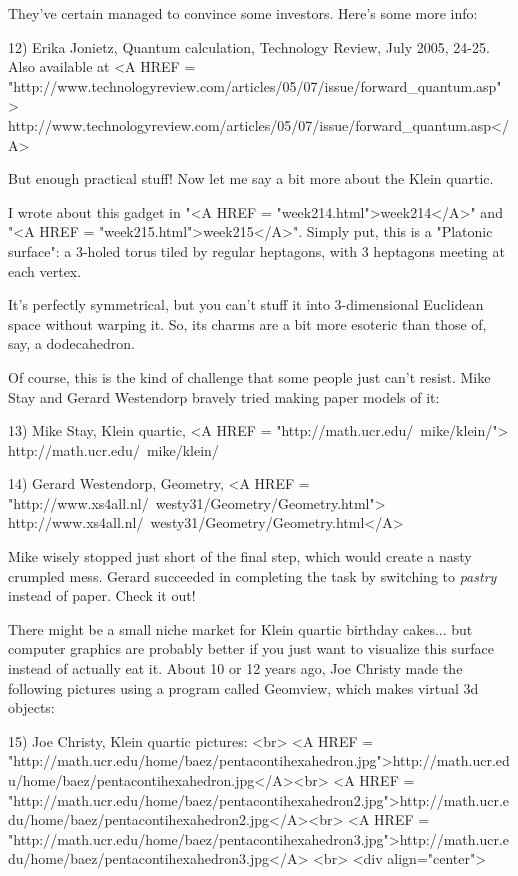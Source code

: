They've certain managed to convince some investors.  Here's some more info:

12) Erika Jonietz, Quantum calculation, Technology Review, July 2005, 24-25.
    Also available at
    <A HREF = "http://www.technologyreview.com/articles/05/07/issue/forward_quantum.asp">
http://www.technologyreview.com/articles/05/07/issue/forward_quantum.asp</A>

But enough practical stuff!  Now let me say a bit more about the Klein quartic.  

I wrote about this gadget in 
"<A HREF = "week214.html">week214</A>" and 
"<A HREF = "week215.html">week215</A>".   
Simply put, this is a "Platonic surface": 
a 3-holed torus tiled by regular heptagons, with 3 
heptagons meeting at each vertex.  

It's perfectly symmetrical, but you can't stuff it into 3-dimensional Euclidean 
space without warping it.  So, its charms are a bit more esoteric than those of,
say, a dodecahedron.

Of course, this is the kind of challenge that some people just can't resist.  
Mike Stay and Gerard Westendorp bravely tried making paper models of it:

13) Mike Stay, Klein quartic, <A HREF = 
"http://math.ucr.edu/~mike/klein/">
http://math.ucr.edu/~mike/klein/

14) Gerard Westendorp, Geometry, <A HREF = 
"http://www.xs4all.nl/~westy31/Geometry/Geometry.html">
http://www.xs4all.nl/~westy31/Geometry/Geometry.html</A>

Mike wisely stopped just short of the final step, which would create a nasty 
crumpled mess.  Gerard succeeded in completing the task by switching to \emph{pastry}
instead of paper.  Check it out!

There might be a small niche market for Klein quartic birthday cakes... but 
computer graphics are probably better if you just want to visualize this surface
instead of actually eat it.  About 10 or 12 years ago, Joe Christy made the 
following pictures using a program called Geomview, which makes virtual 3d objects:

15) Joe Christy, Klein quartic pictures: <br>
    <A HREF = "http://math.ucr.edu/home/baez/pentacontihexahedron.jpg">http://math.ucr.edu/home/baez/pentacontihexahedron.jpg</A><br>
    <A HREF = "http://math.ucr.edu/home/baez/pentacontihexahedron2.jpg">http://math.ucr.edu/home/baez/pentacontihexahedron2.jpg</A><br>
    <A HREF = "http://math.ucr.edu/home/baez/pentacontihexahedron3.jpg">http://math.ucr.edu/home/baez/pentacontihexahedron3.jpg</A>
<br>
<div align="center">


